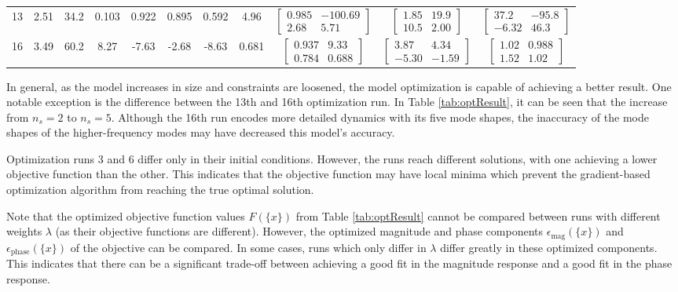 \begin{landscape}
\begin{table}[H]
\begin{tabular}{ccccccccccc}
		13 & 2.51 & 34.2 & 0.103 & 0.922 & 0.895 & 0.592 & 4.96 & $\begin{bmatrix}0.985 & -100.69 \\ 2.68 & 5.71\end{bmatrix}$ & $\begin{bmatrix}1.85 & 19.9 \\ 10.5 & 2.00\end{bmatrix}$ & $\begin{bmatrix}37.2 & -95.8 \\ -6.32 & 46.3\end{bmatrix}$ \\
		16 & 3.49 & 60.2 & 8.27 & -7.63 & -2.68 & -8.63 & 0.681 & $\begin{bmatrix}0.937 & 9.33 \\ 0.784 & 0.688\end{bmatrix}$ & $\begin{bmatrix}3.87 & 4.34 \\ -5.30 & -1.59\end{bmatrix}$ & $\begin{bmatrix}1.02 & 0.988 \\ 1.52 & 1.02\end{bmatrix}$ \\
		\hline\hline
	\end{tabular}
\end{table}

\end{landscape}

In general, as the model increases in size and constraints are loosened, the model optimization is capable of achieving a better result. One notable exception is the difference between the 13th and 16th optimization run. In Table \ref{tab:optResult}, it can be seen that the increase from $n_s=2$ to $n_s=5$. Although the 16th run encodes more detailed dynamics with its five mode shapes, the inaccuracy of the mode shapes of the higher-frequency modes may have decreased this model's accuracy.

Optimization runs 3 and 6 differ only in their initial conditions. However, the runs reach different solutions, with one achieving a lower objective function than the other. This indicates that the objective function may have local minima which prevent the gradient-based optimization algorithm from reaching the true optimal solution.

Note that the optimized objective function values $F(\{x\})$ from Table \ref{tab:optResult} cannot be compared between runs with different weights $\lambda$ (as their objective functions are different). However, the optimized magnitude and phase components $\epsilon_\text{mag}(\{x\})$ and $\epsilon_\text{phase}(\{x\})$ of the objective can be compared. In some cases, runs which only differ in $\lambda$ differ greatly in these optimized components. This indicates that there can be a significant trade-off between achieving a good fit in the magnitude response and a good fit in the phase response.

